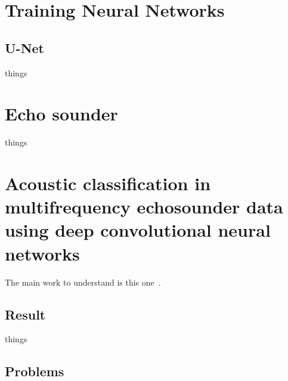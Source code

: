 \section{Training Neural Networks} \label{training neural networks}
        
        
    \subsection{U-Net}
        things







\section{Echo sounder}
    things
    
    
\section{Acoustic classification in multifrequency echosounder data using deep convolutional neural networks}
    
    The main work to understand is this one~\cite{brautaset2020acoustic}. 
    
    
    
    \subsection{Result}
        things
    \subsection{Problems}
        
    